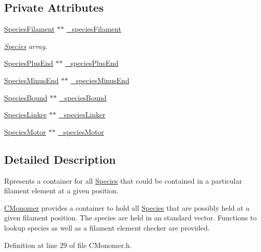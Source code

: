 \subsection*{Private Attributes}
{\bf }\par
\begin{DoxyCompactItemize}
\item 
\hyperlink{classSpeciesFilament}{Species\+Filament} $\ast$$\ast$ \hyperlink{classCMonomer_aa6d658b1fb0e90a549bfc0dedfc3b2a5}{\+\_\+species\+Filament}
\begin{DoxyCompactList}\small\item\em \hyperlink{classSpecies}{Species} array. \end{DoxyCompactList}\item 
\hyperlink{classSpeciesPlusEnd}{Species\+Plus\+End} $\ast$$\ast$ \hyperlink{classCMonomer_a536f3c948c52d79c73fe406048071e7b}{\+\_\+species\+Plus\+End}
\item 
\hyperlink{classSpeciesMinusEnd}{Species\+Minus\+End} $\ast$$\ast$ \hyperlink{classCMonomer_a76ec86baa9b2f8e4711389481b191584}{\+\_\+species\+Minus\+End}
\item 
\hyperlink{classSpeciesBound}{Species\+Bound} $\ast$$\ast$ \hyperlink{classCMonomer_a24078fb0d0c2d60e79af1cfea30b0d79}{\+\_\+species\+Bound}
\item 
\hyperlink{classSpeciesLinker}{Species\+Linker} $\ast$$\ast$ \hyperlink{classCMonomer_aa549a348f1f8e77283c4aaa2e555aca1}{\+\_\+species\+Linker}
\item 
\hyperlink{classSpeciesMotor}{Species\+Motor} $\ast$$\ast$ \hyperlink{classCMonomer_af3b42603df2c3e4dff67457bad776fd6}{\+\_\+species\+Motor}
\end{DoxyCompactItemize}



\subsection{Detailed Description}
Rpresents a container for all \hyperlink{classSpecies}{Species} that could be contained in a particular filament element at a given position. 

\hyperlink{classCMonomer}{C\+Monomer} provides a container to hold all \hyperlink{classSpecies}{Species} that are possibly held at a given filament position. The species are held in an standard vector. Functions to lookup species as well as a filament element checker are provided. 

Definition at line 29 of file C\+Monomer.\+h.



